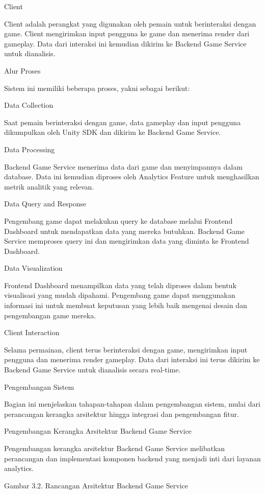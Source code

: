 Client

Client adalah perangkat yang digunakan oleh pemain untuk berinteraksi dengan game. Client mengirimkan input pengguna ke game dan menerima render dari gameplay. Data dari interaksi ini kemudian dikirim ke Backend Game Service untuk dianalisis.

Alur Proses

Sistem ini memiliki beberapa proses, yakni sebagai berikut:

Data Collection

Saat pemain berinteraksi dengan game, data gameplay dan input pengguna dikumpulkan oleh Unity SDK dan dikirim ke Backend Game Service.

Data Processing

Backend Game Service menerima data dari game dan menyimpannya dalam database. Data ini kemudian diproses oleh Analytics Feature untuk menghasilkan metrik analitik yang relevan.

Data Query and Response

Pengembang game dapat melakukan query ke database melalui Frontend Dashboard untuk mendapatkan data yang mereka butuhkan. Backend Game Service memproses query ini dan mengirimkan data yang diminta ke Frontend Dashboard.

Data Visualization

Frontend Dashboard menampilkan data yang telah diproses dalam bentuk visualisasi yang mudah dipahami. Pengembang game dapat menggunakan informasi ini untuk membuat keputusan yang lebih baik mengenai desain dan pengembangan game mereka.

Client Interaction

Selama permainan, client terus berinteraksi dengan game, mengirimkan input pengguna dan menerima render gameplay. Data dari interaksi ini terus dikirim ke Backend Game Service untuk dianalisis secara real-time.

Pengembangan Sistem

Bagian ini menjelaskan tahapan-tahapan dalam pengembangan sistem, mulai dari perancangan kerangka arsitektur hingga integrasi dan pengembangan fitur.

Pengembangan Kerangka Arsitektur Backend Game Service

Pengembangan kerangka arsitektur Backend Game Service melibatkan perancangan dan implementasi komponen backend yang menjadi inti dari layanan analytics.

Gambar 3.2. Rancangan Arsitektur Backend Game Service

